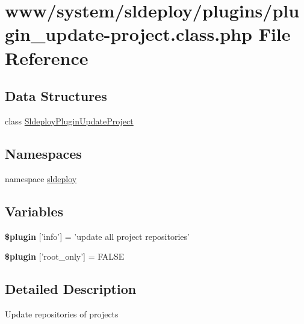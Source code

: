 \hypertarget{plugin__update-project_8class_8php}{
\section{www/system/sldeploy/plugins/plugin\_\-update-\/project.class.php File Reference}
\label{plugin__update-project_8class_8php}
}
\subsection*{Data Structures}
\begin{DoxyCompactItemize}
\item 
class \hyperlink{class_sldeploy_plugin_update_project}{SldeployPluginUpdateProject}
\end{DoxyCompactItemize}
\subsection*{Namespaces}
\begin{DoxyCompactItemize}
\item 
namespace \hyperlink{namespacesldeploy}{sldeploy}
\end{DoxyCompactItemize}
\subsection*{Variables}
\begin{DoxyCompactItemize}
\item 
\hypertarget{plugin__update-project_8class_8php_a95edf69ebbeaeedb03bab3bb010f2af9}{
{\bfseries \$plugin} \mbox{[}'info'\mbox{]} = 'update all project repositories'}
\label{plugin__update-project_8class_8php_a95edf69ebbeaeedb03bab3bb010f2af9}

\item 
\hypertarget{plugin__update-project_8class_8php_a1d302084fa15e3efe6c843cbb5096985}{
{\bfseries \$plugin} \mbox{[}'root\_\-only'\mbox{]} = FALSE}
\label{plugin__update-project_8class_8php_a1d302084fa15e3efe6c843cbb5096985}

\end{DoxyCompactItemize}


\subsection{Detailed Description}
Update repositories of projects 